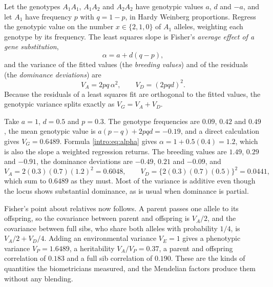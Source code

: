 \begin{example}\label{intro:ex:fisher}
Let the genotypes $A_1A_1$, $A_1A_2$ and $A_2A_2$ have genotypic values $a$, $d$ and $-a$, and let
$A_1$ have frequency $p$ with $q=1-p$, in Hardy Weinberg proportions. Regress the genotypic value
on the number $x\in\{2,1,0\}$ of $A_1$ alleles, weighting each genotype by its frequency. The
least squares slope is Fisher's \emph{average effect of a gene substitution},
\begin{equation}\label{intro:eq:alpha}
\alpha=a+d(q-p),
\end{equation}
and the variance of the fitted values (the \emph{breeding values}) and of the residuals (the
\emph{dominance deviations}) are
\begin{equation}\label{intro:eq:VAVD}
V_A=2pq\,\alpha^2,\qquad V_D=(2pqd)^2 .
\end{equation}
Because the residuals of a least squares fit are orthogonal to the fitted values, the genotypic
variance splits exactly as $V_G=V_A+V_D$.

Take $a=1$, $d=0.5$ and $p=0.3$. The genotype frequencies are $0.09$, $0.42$ and $0.49$, the mean
genotypic value is $a(p-q)+2pqd=-0.19$, and a direct calculation gives $V_G=0.6489$. Formula
\eqref{intro:eq:alpha} gives $\alpha=1+0.5(0.4)=1.2$, which is also the slope a weighted regression
returns. The breeding values are $1.49$, $0.29$ and $-0.91$, the dominance deviations are $-0.49$,
$0.21$ and $-0.09$, and
\begin{equation*}
V_A=2(0.3)(0.7)(1.2)^2=0.6048,\qquad V_D=\{2(0.3)(0.7)(0.5)\}^2=0.0441,
\end{equation*}
which sum to $0.6489$ as they must. Most of the variance is additive even though the locus shows
substantial dominance, as is usual when dominance is partial.

Fisher's point about relatives now follows. A parent passes one allele to its offspring, so the
covariance between parent and offspring is $V_A/2$, and the covariance between full sibs, who
share both alleles with probability $1/4$, is $V_A/2+V_D/4$. Adding an environmental variance
$V_E=1$ gives a phenotypic variance $V_P=1.6489$, a heritability $V_A/V_P=0.37$, a parent and
offspring correlation of $0.183$ and a full sib correlation of $0.190$. These are the kinds of quantities the
biometricians measured, and the Mendelian factors produce them without any blending.
\end{example}

